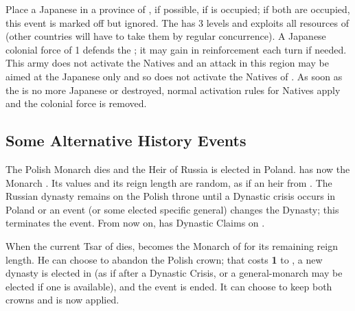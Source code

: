 

\phevnt
\aparag Place a Japanese \TP in a province of \granderegionCorea,
\provinceSeoul if possible, \provincePyongyang if \provinceSeoul is occupied;
if both are occupied, this event is marked off but ignored.
\aparag The \TP has 3 levels and exploits all resources of \granderegionCorea
(other countries will have to take them by regular concurrence).
\aparag A Japanese colonial force of 1 \ARMY\faceplus defends the \TP; it may
gain \ARMY\facemoins in reinforcement each turn if needed.  This army does not
activate the Natives and an attack in this region may be aimed at the Japanese
only and so does not activate the Natives of \granderegionCorea. As soon as
the \TP is no more Japanese or destroyed, normal activation rules for Natives
apply and the colonial force is removed.



\subsection{Some Alternative History Events}





\phevnt
\aparag The Polish Monarch dies and the Heir of Russia is elected in
Poland. \POL has now the Monarch .  Its values and its reign
length are random, as if an heir from \RUS.
\aparag The Russian dynasty remains on the Polish throne until a Dynastic
crisis occurs in Poland or an event (or some elected specific general) changes
the Dynasty; this terminates the event. From now on, \RUS has Dynastic Claims
on \POL.

\activation{}
\aparag When the current Tsar of \RUS dies,  becomes the
Monarch of \RUS for its remaining reign length.
\aparag He can choose to abandon the Polish crown; that costs {\bf 1} \STAB to
\RUS, a new dynasty is elected in \POL (as if after a Dynastic Crisis, or a
general-monarch may be elected if one is available), and the event is ended.
\aparag It can choose to keep both crowns and  is now applied.

